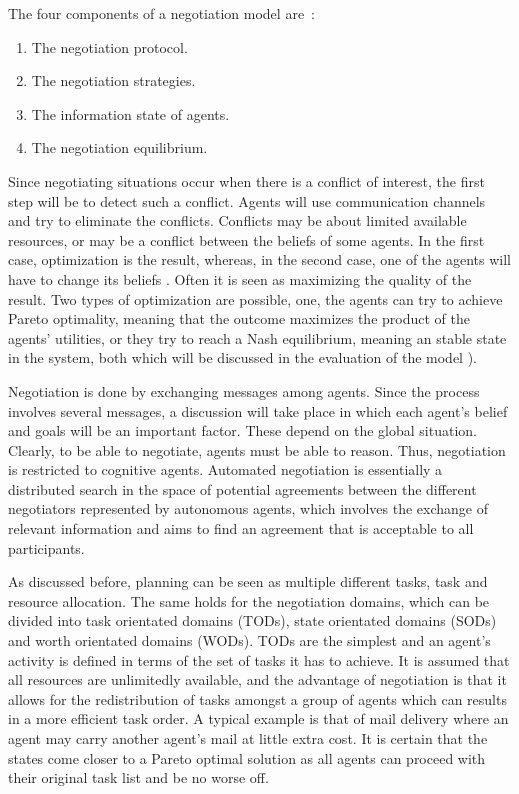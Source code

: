 The four components of a negotiation model are~\citep{fatima2004agenda}:
\begin{enumerate}
	\item The negotiation protocol.
	\item The negotiation strategies.
	\item The information state of agents.
	\item The negotiation equilibrium.
\end{enumerate}

Since negotiating situations occur when there is a conflict of interest, the first step will be to detect such a conflict. Agents will use communication channels and try to eliminate the conflicts. Conflicts may be about limited available resources, or may be a conflict between the beliefs of some agents. In the first case, optimization is the result, whereas, in the second case, one of the agents will have to change its beliefs \citep{shen2003multi}. Often it is seen as maximizing the quality of the result. Two types of optimization are possible, one, the agents can try to achieve Pareto optimality, meaning that the outcome maximizes the product of the agents' utilities, or they try to reach a Nash equilibrium, meaning an stable state in the system, both which will be discussed in the evaluation of the model ).

Negotiation is done by exchanging messages among agents. Since the process involves several messages, a discussion will take place in which each agent's belief and goals will be an important factor. These depend on the global situation. Clearly, to be able to negotiate, agents must be able to reason. Thus, negotiation is restricted to cognitive agents. Automated negotiation is essentially a distributed search in the space of potential agreements between the different negotiators represented by autonomous agents, which involves the exchange of relevant information and aims to find an agreement that is acceptable to all participants.

As discussed before, planning can be seen as multiple different tasks, task and resource allocation. The same holds for the negotiation domains, which can be divided into task orientated domains (TODs), state orientated domains (SODs) and worth orientated domains (WODs). TODs are the simplest and an agent's activity is defined in terms of the set of tasks it has to achieve. It is assumed that all resources are unlimitedly available, and the advantage of negotiation is that it allows for the redistribution of tasks amongst a group of agents which can results in a more efficient task order. A typical example is that of mail delivery where an agent may carry another agent's mail at little extra cost. It is certain that the states come closer to a Pareto optimal solution as all agents can proceed with their original task list and be no worse off. 

